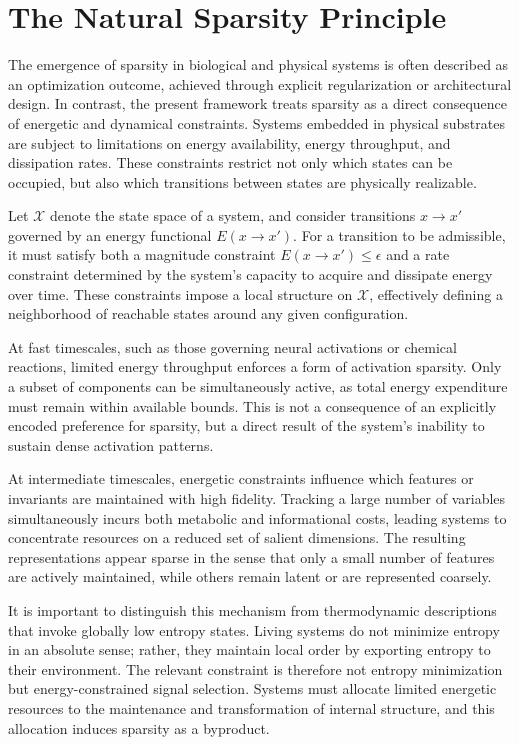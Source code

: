 \documentclass[12pt]{article}
\theoremstyle{plain}
\theoremstyle{definition}
\theoremstyle{remark}
\begin{document}
\section{The Natural Sparsity Principle}

The emergence of sparsity in biological and physical systems is often described as an optimization outcome, achieved through explicit regularization or architectural design. In contrast, the present framework treats sparsity as a direct consequence of energetic and dynamical constraints. Systems embedded in physical substrates are subject to limitations on energy availability, energy throughput, and dissipation rates. These constraints restrict not only which states can be occupied, but also which transitions between states are physically realizable.

Let $\mathcal{X}$ denote the state space of a system, and consider transitions $x \to x'$ governed by an energy functional $E(x \to x')$. For a transition to be admissible, it must satisfy both a magnitude constraint $E(x \to x') \leq \epsilon$ and a rate constraint determined by the system's capacity to acquire and dissipate energy over time. These constraints impose a local structure on $\mathcal{X}$, effectively defining a neighborhood of reachable states around any given configuration.

At fast timescales, such as those governing neural activations or chemical reactions, limited energy throughput enforces a form of activation sparsity. Only a subset of components can be simultaneously active, as total energy expenditure must remain within available bounds. This is not a consequence of an explicitly encoded preference for sparsity, but a direct result of the system's inability to sustain dense activation patterns.

At intermediate timescales, energetic constraints influence which features or invariants are maintained with high fidelity. Tracking a large number of variables simultaneously incurs both metabolic and informational costs, leading systems to concentrate resources on a reduced set of salient dimensions. The resulting representations appear sparse in the sense that only a small number of features are actively maintained, while others remain latent or are represented coarsely.

It is important to distinguish this mechanism from thermodynamic descriptions that invoke globally low entropy states. Living systems do not minimize entropy in an absolute sense; rather, they maintain local order by exporting entropy to their environment. The relevant constraint is therefore not entropy minimization but energy-constrained signal selection. Systems must allocate limited energetic resources to the maintenance and transformation of internal structure, and this allocation induces sparsity as a byproduct.
\end{document}
